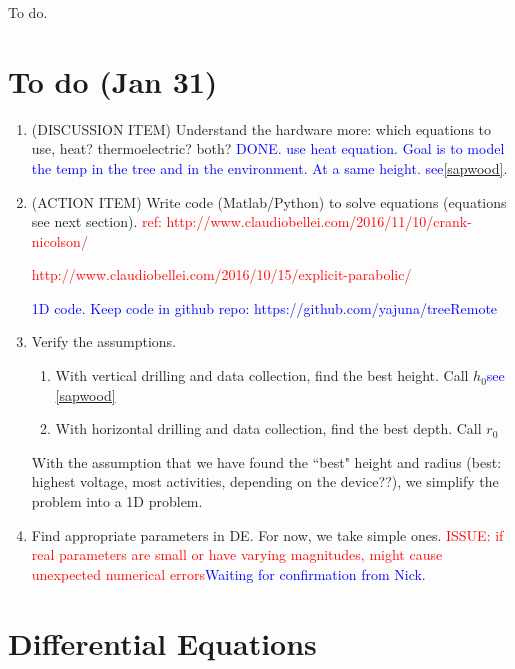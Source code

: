 \documentclass[12pt]{article}
\begin{document}
To do.


\newpage

\section{To do (Jan 31)}
\begin{enumerate}
\item (DISCUSSION ITEM) Understand the hardware more: which equations to use, heat? thermoelectric? both? \textcolor{blue}{DONE. use heat equation. Goal is to model the temp in the tree and in the environment. At a same height. see\ref{sapwood}.}

\item (ACTION ITEM) Write code (Matlab/Python) to solve equations (equations see next section). \textcolor{red}{ref: http://www.claudiobellei.com/2016/11/10/crank-nicolson/}

\textcolor{red}{http://www.claudiobellei.com/2016/10/15/explicit-parabolic/}

\textcolor{blue}{1D code. Keep code in github repo: https://github.com/yajuna/treeRemote}

\item Verify the assumptions. 
\begin{enumerate}
\item With vertical drilling and data collection, find the best height. Call $h_0$\textcolor{blue}{see \ref{sapwood}}
\item With horizontal drilling and data collection, find the best depth. Call $r_0$
\end{enumerate}

With the assumption that we have found the ``best" height and radius (best: highest voltage, most activities, depending on the device??), we simplify the problem into a 1D problem. 


\item Find appropriate parameters in DE. For now, we take simple ones. \textcolor{red}{ISSUE: if real parameters are small or have varying magnitudes, might cause unexpected numerical errors}\textcolor{blue}{Waiting for confirmation from Nick.}


\end{enumerate}

\section{Differential Equations}

\end{document}
